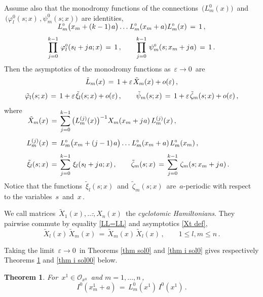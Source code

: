 \documentclass[12pt]{amsart}
\def\>{\relax\ifmmode\mskip.666667\thinmuskip\relax\else\kern.111111em\fi}
\def\<{\relax\ifmmode\mskip-.333333\thinmuskip\relax\else\kern-.0555556em\fi}
\def\vsk#1>{\vskip#1\baselineskip}
\def\vvn#1>{\vadjust{\nobreak\vsk#1>\nobreak}\ignorespaces}
\let\sssize\scriptscriptstyle \def\tfrac{\textstyle\frac}
\newtheorem{thm}{Theorem}[section]
\theoremstyle{definition} %
\numberwithin{equation}{section}
\theoremstyle{definition}
\let\mc\mathcal
\let\eps\varepsilon
\let\phi\varphi
\let\le\leqslant
\def\0{{\sssize0}}
\def\be{\begin{equation*}}
\def\ee{\end{equation*}}
\begin{document}
Assume also that the monodromy functions of the connections \,$\bigl(L^\0_m(x)\bigr)$ \,and
\\
\,$\bigl(\phi_l^\0(s;x)\,,\psi_m^\0(s;x)\bigr)$ \,are identities,
\begin{gather*}
\\[-24pt]
L^\0_m\bigl(x_m+(k-1)\>a\bigr)\dots\<\>L_m^\0(x_m+a)L_m^\0(x)\,=\,1\,,
\\[3pt]
\prod_{j=0}^{k-1}\,\phi_l^\0(s_l+j\<\>a;x)\,=\,1\,,\qquad
\prod_{j=0}^{k-1}\,\psi_m^\0(s;x_m+j\<\>a)\,=\,1\,.
\end{gather*}
Then the asymptotics of the monodromy functions as \,$\eps\to0$ \,are
\begin{gather}
\label{Xt def}
\tilde L_m(x)\,=\,1+\eps\>\tilde X_m(x)+o(\eps)\,,
\\[3pt]
\notag
\tilde\phi_l(s;x)\,=\,1+\eps\>\tilde\xi_l(s;x)+o(\eps)\,,\qquad
\tilde\psi_m(s;x)\,=\,1+\eps\>\tilde\zeta_m(s;x)+o(\eps)\,,
\end{gather}
where
\begin{align}
\notag
\\[-30pt]
\label{tilde X}
\tilde X_m(x)\,&{}=\,\sum_{j=0}^{k-1}\,
\bigl(L_m^{(j)}(x)\bigr)^{-1}X_m(x_m+j\<\>a)\,L_m^{(j)}(x)\,,
\\[4pt]
\notag
L_m^{(j)}(x)\,&{}=\,L_m^\0\bigl(x_m+(j-1)\>a\bigr)\dots\<\>L_m^\0(x_m+a)\>L_m^\0(x_m)\,,
\\[4pt]
\notag
\tilde\xi_l(s;x)\,&{}=\,\sum_{j=0}^{k-1}\,\xi_l(s_l+j\<\>a;x)\,,\qquad
\tilde\zeta_m(s;x)\,=\,\sum_{j=0}^{k-1}\,\zeta_m(s;x_m+j\<\>a)\,.
\end{align}
Notice that the functions \,$\tilde\xi_l(s;x)$ \,and \,$\tilde\zeta_m(s;x)$
\,are \,$a$-periodic with respect to the variables \,$s$ \,and \,$x$\,.

\smallskip
We call matrices \,$\tilde X_1(x),\dots\tilde, X_n(x)$ \,the {\it cyclotomic Hamiltonians\/}.
They pairwise commute by equality \eqref{LL=LL} and asymptotics \eqref{Xt def},
\vvn.4>
\be
\tilde X_l(x)\,\tilde X_m(x)\,=\,\tilde X_m(x)\,\tilde X_l(x)\,,\qquad
1\le l,m\le n\,.
\ee

\medskip
Taking the limit \,$\eps\to 0$ \,in Theorems \ref{thm sol0} and
\ref{thm i sol0} gives respectively Theorems \ref{thm sol00} and
\ref{thm i sol00} below.

\begin{thm}
\label{thm sol00}
For \,$x^1\in \mc O_{x^0}$ \,and \;$m=1,\dots, n$\,,
\vvn.4>
\be
I^\0(x^1_m+a)\,=\,L_m^\0(x^1)\,I^\0(x^1)\,.
\ee
\end{thm}
\end{document}
